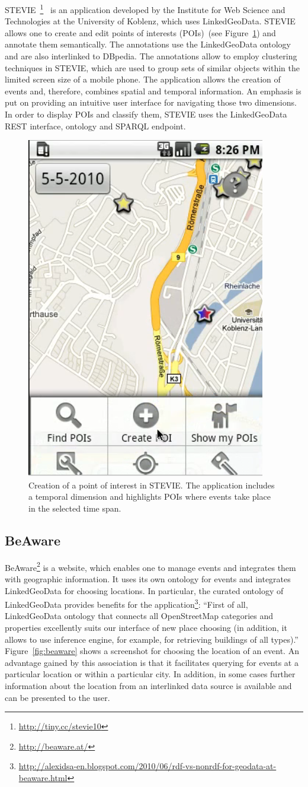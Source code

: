 STEVIE~\footnote{\url{http://tiny.cc/stevie10}}~\cite{stevie} is an application
developed by the Institute for Web Science and Technologies at the University of
Koblenz, which uses LinkedGeoData.
STEVIE allows one to create and edit points of interests (POIs)~(see
Figure~\ref{fig:stevie}) and annotate them semantically. The annotations use the LinkedGeoData ontology and are also interlinked to DBpedia. The annotations allow to employ clustering techniques in STEVIE, which are used to group sets of similar objects within the limited screen size of a mobile phone. The application allows the creation of events and, therefore, combines spatial and temporal information. An emphasis is put on providing an intuitive user interface for navigating those two dimensions. In order to display POIs and classify them, STEVIE uses the LinkedGeoData REST interface, ontology and SPARQL endpoint.

\begin{figure}[bt]
	\includegraphics[width=.35\textwidth]{images/stevie}
	\caption{Creation of a point of interest in STEVIE. The application includes a temporal dimension and highlights POIs where events take place in the selected time span.}
	\label{fig:stevie}
\end{figure}

\subsection{BeAware}

BeAware\footnote{\url{http://beaware.at/}} is a website, which enables one
to manage events and integrates them with geographic information. It
uses its own ontology for events and integrates LinkedGeoData for choosing locations. In particular, the curated ontology of LinkedGeoData provides benefits for the application\footnote{\url{http://alexidsa-en.blogspot.com/2010/06/rdf-vs-nonrdf-for-geodata-at-beaware.html}}: ``First of all, LinkedGeoData ontology that connects all OpenStreetMap categories and properties excellently suits our interface of new place choosing (in addition, it allows to use inference engine, for example, for retrieving buildings of all types).'' Figure~\ref{fig:beaware} shows a screenshot for choosing the location of an event. An advantage gained by this association is that it facilitates querying for events at a particular location or within a particular city. In addition, in some cases further information about the location from an interlinked data source is available and can be presented to the user.

